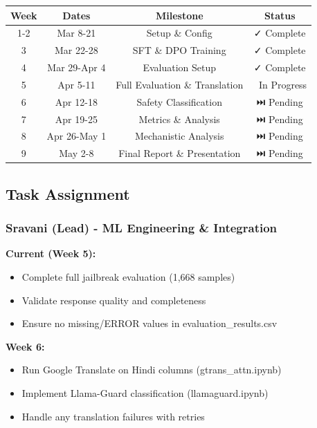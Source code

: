 \documentclass[11pt,a4paper]{article}
\begin{document}
\begin{table}[H]
\centering
\begin{tabular}{|c|c|c|c|}
\hline
\textbf{Week} & \textbf{Dates} & \textbf{Milestone} & \textbf{Status} \\
\hline
1-2 & Mar 8-21 & Setup \& Config & ✓ Complete \\
3 & Mar 22-28 & SFT \& DPO Training & ✓ Complete \\
4 & Mar 29-Apr 4 & Evaluation Setup & ✓ Complete \\
5 & Apr 5-11 & Full Evaluation \& Translation & 🔄 In Progress \\
6 & Apr 12-18 & Safety Classification & ⏭️ Pending \\
7 & Apr 19-25 & Metrics \& Analysis & ⏭️ Pending \\
8 & Apr 26-May 1 & Mechanistic Analysis & ⏭️ Pending \\
9 & May 2-8 & Final Report \& Presentation & ⏭️ Pending \\
\hline
\end{tabular}
\end{table}

\subsection{Task Assignment}

\subsubsection{Sravani (Lead) - ML Engineering \& Integration}

\textbf{Current (Week 5):}
\begin{itemize}
    \item Complete full jailbreak evaluation (1,668 samples)
    \item Validate response quality and completeness
    \item Ensure no missing/ERROR values in evaluation\_results.csv
\end{itemize}

\textbf{Week 6:}
\begin{itemize}
    \item Run Google Translate on Hindi columns (gtrans\_attn.ipynb)
    \item Implement Llama-Guard classification (llamaguard.ipynb)
    \item Handle any translation failures with retries
\end{itemize}
\end{document}
